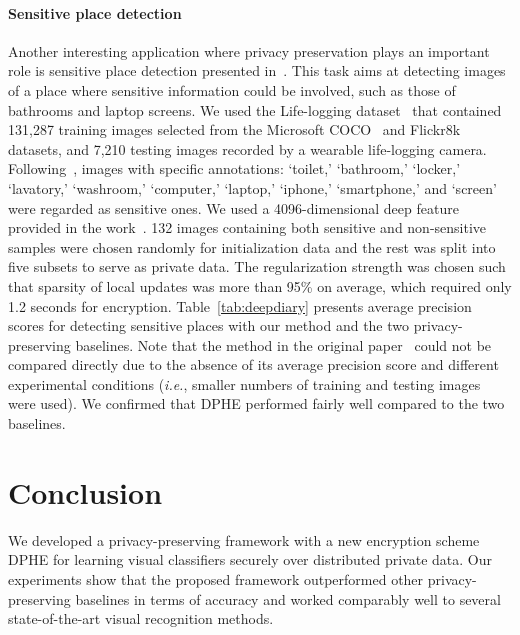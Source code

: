 \documentclass[10pt,twocolumn,letterpaper]{article}
\def\ie{{\it i.e.}}
\begin{document}
\paragraph{Sensitive place detection}
Another interesting application where privacy preservation plays an important role is sensitive place detection presented in~\cite{Fan2016a,Korayem2016a,Templeman2014a}. This task aims at detecting images of a place where sensitive information could be involved, such as those of bathrooms and laptop screens. We used the Life-logging dataset~\cite{Fan2016a} that contained 131,287 training images selected from the Microsoft COCO~\cite{Lin2014b} and Flickr8k~\cite{Hodosh2013} datasets, and 7,210 testing images recorded by a wearable life-logging camera. Following~\cite{Fan2016a}, images with specific annotations: `toilet,' `bathroom,' `locker,' `lavatory,' `washroom,' `computer,' `laptop,' `iphone,' `smartphone,' and `screen' were regarded as sensitive ones. We used a 4096-dimensional deep feature provided in the work~\cite{Fan2016a}. 132 images containing both sensitive and non-sensitive samples were chosen randomly for initialization data and the rest was split into five subsets to serve as private data. The regularization strength was chosen such that sparsity of local updates was more than 95\% on average, which required only 1.2 seconds for encryption. Table~\ref{tab:deepdiary} presents average precision scores for detecting sensitive places with our method and the two privacy-preserving baselines. Note that the method in the original paper~\cite{Fan2016a} could not be compared directly due to the absence of its average precision score and different experimental conditions (\ie, smaller numbers of training and testing images were used). We confirmed that DPHE performed fairly well compared to the two baselines.

\begin{table}[t]
\caption{{\bf Sensitive Place Detection on Life-logging Dataset}: average precision for detecting images of sensitive places.}
\centering
{}
\label{tab:deepdiary}
\end{table}

\section{Conclusion}
We developed a privacy-preserving framework with a new encryption scheme DPHE for learning visual classifiers securely over distributed private data. Our experiments show that the proposed framework outperformed other privacy-preserving baselines \cite{Pathak2010a,Rajkumar2012a} in terms of accuracy and worked comparably well to several state-of-the-art visual recognition methods.
\end{document}
